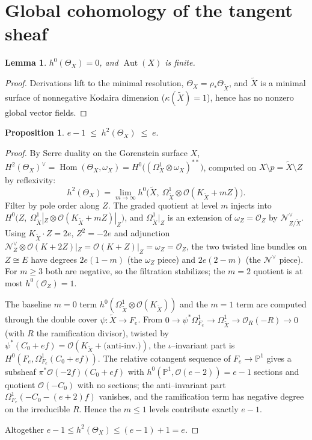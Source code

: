 \documentclass[11pt]{amsart}
\newtheorem{proposition}{Proposition}
\newtheorem{lemma}{Lemma}
\theoremstyle{definition}
\DeclareMathOperator{\Aut}{Aut}
\DeclareMathOperator{\Hom}{Hom}
\newcommand{\cO}{\mathcal{O}}
\newcommand{\cN}{\mathcal{N}}
\newcommand{\Om}{\Omega}
\newcommand{\PP}{\mathbb{P}}
\newcommand{\Xt}{\widetilde{X}}
\begin{document}
\section{Global cohomology of the tangent sheaf}

\begin{lemma}\label{lem:aut}
$h^0(\Theta_X)=0$, and $\Aut(X)$ is finite.
\end{lemma}

\begin{proof}
Derivations lift to the minimal resolution, $\Theta_X=\rho_*\Theta_{\Xt}$, and
$\Xt$ is a minimal surface of nonnegative Kodaira dimension ($\kappa(\Xt)=1$),
hence has no nonzero global vector fields.
\end{proof}

\begin{proposition}\label{prop:h2}
$e-1\;\le\;h^2(\Theta_X)\;\le\;e.$
\end{proposition}

\begin{proof}
By Serre duality on the Gorenstein surface $X$,
$H^2(\Theta_X)^\vee=\Hom(\Theta_X,\omega_X)=H^0\big((\Om^1_X\otimes\omega_X)^{**}\big)$,
computed on $X\setminus p=\Xt\setminus Z$ by reflexivity:
\[
h^2(\Theta_X)=\lim_{m\to\infty} h^0\big(\Xt,\ \Om^1_{\Xt}\otimes\cO(K_{\Xt}+mZ)\big).
\]
Filter by pole order along $Z$. The graded quotient at level $m$ injects into
$H^0\big(Z,\ \Om^1_{\Xt}|_Z\otimes\cO(K_{\Xt}+mZ)|_Z\big)$, and
$\Om^1_{\Xt}|_Z$ is an extension of $\omega_Z=\cO_Z$ by $\cN^\vee_{Z/\Xt}$.
Using $K_{\Xt}\cdot Z=2e$, $Z^2=-2e$ and adjunction
$\cN^\vee_Z\otimes\cO(K+2Z)|_Z=\cO(K+Z)|_Z=\omega_Z=\cO_Z$, the two twisted
line bundles on $Z\cong E$ have degrees $2e(1-m)$ (the $\omega_Z$ piece) and
$2e(2-m)$ (the $\cN^\vee$ piece). For $m\ge3$ both are negative, so the
filtration stabilizes; the $m=2$ quotient is at most $h^0(\cO_Z)=1$.

The baseline $m=0$ term $h^0(\Om^1_{\Xt}\otimes\cO(K_{\Xt}))$ and the $m=1$ term
are computed through the double cover $\psi\colon\Xt\to F_e$. From
$0\to\psi^*\Om^1_{F_e}\to\Om^1_{\Xt}\to\cO_R(-R)\to0$ (with $R$ the ramification
divisor), twisted by $\psi^*(C_0+ef)=\cO(K_{\Xt}+\text{(anti-inv.)})$, the
$\iota$--invariant part is $H^0(F_e,\Om^1_{F_e}(C_0+ef))$. The relative cotangent
sequence of $F_e\to\PP^1$ gives a subsheaf $\pi^*\cO(-2f)(C_0+ef)$ with
$h^0(\PP^1,\cO(e-2))=e-1$ sections and quotient $\cO(-C_0)$ with no sections; the
anti--invariant part $\Om^1_{F_e}(-C_0-(e+2)f)$ vanishes, and the ramification
term has negative degree on the irreducible $R$. Hence the $m\le1$ levels
contribute exactly $e-1$.

Altogether $e-1\le h^2(\Theta_X)\le (e-1)+1=e$.
\end{proof}
\end{document}
